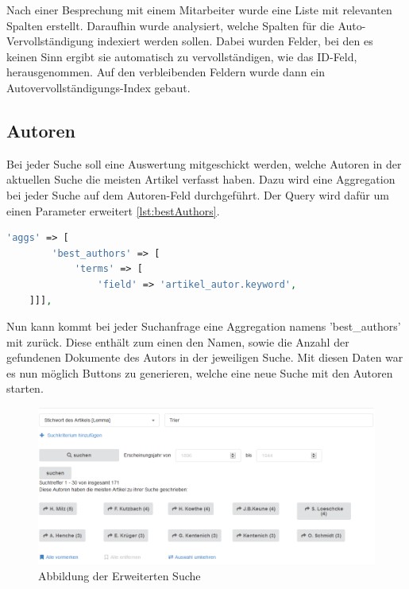 Nach einer Besprechung mit einem Mitarbeiter wurde eine Liste mit relevanten Spalten erstellt. Daraufhin wurde analysiert, welche Spalten für die Auto-Vervollständigung indexiert werden sollen. Dabei wurden Felder, bei den es keinen Sinn ergibt sie automatisch zu vervollständigen, wie das ID-Feld, herausgenommen. Auf den verbleibenden Feldern wurde dann ein Autovervollständigungs-Index gebaut.

\subsection{Autoren}

Bei jeder Suche soll eine Auswertung mitgeschickt werden, welche Autoren in der aktuellen Suche die meisten Artikel verfasst haben. Dazu wird eine Aggregation bei jeder Suche auf dem Autoren-Feld durchgeführt. Der Query wird dafür um einen Parameter erweitert \ref{lst:bestAuthors}.

\begin{lstlisting}[language=PHP, frame=single, label={lst:bestAuthors}] 
    'aggs' => [
        'best_authors' => [
            'terms' => [
                'field' => 'artikel_autor.keyword',
    ]]],
\end{lstlisting}


Nun kann kommt bei jeder Suchanfrage eine Aggregation namens 'best\_authors' mit zurück. Diese enthält zum einen den Namen, sowie die Anzahl der gefundenen Dokumente des Autors in der jeweiligen Suche. 
Mit diesen Daten war es nun möglich Buttons zu generieren, welche eine neue Suche mit den Autoren starten.


\begin{figure}
	\centering
	\includegraphics[width=1\linewidth]{images/best_authors.png}
	\caption{Abbildung der Erweiterten Suche}
	\label{img:timeProdEla}
\end{figure}
